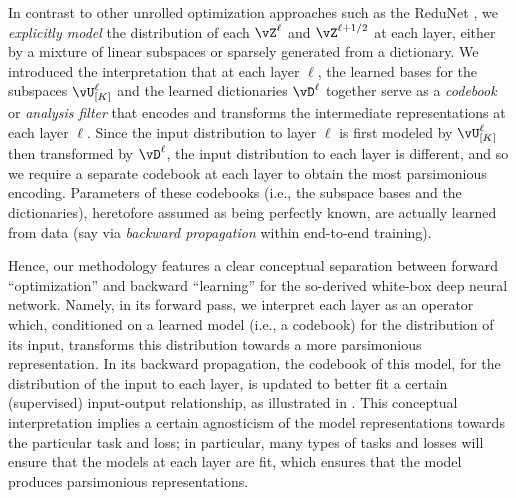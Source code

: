 \documentclass[../../book-main.tex]{subfiles}
\begin{document}
\begin{remark}\label{sub:forward_backward}
    In contrast to other unrolled optimization approaches such as the
    ReduNet \cite{chan2021redunet}, we \textit{explicitly model} the
    distribution of each $\vZ^\ell$ and $\vZ^{\ell + 1/2}$ at each
    layer, either by a mixture of linear subspaces or sparsely
    generated from a dictionary. We introduced the interpretation
    that at each layer \(\ell\), the learned bases for the subspaces
    \(\vU_{[K]}^{\ell}\) and the learned dictionaries \(\vD^{\ell}\)
    together serve as a \textit{codebook} or \textit{analysis filter}
    that encodes and transforms the intermediate representations at
    each layer \(\ell\). Since the input distribution to layer
    \(\ell\) is first modeled by \(\vU_{[K]}^{\ell}\) then
    transformed by \(\vD^{\ell}\), the input distribution to each
    layer is different, and so we require a separate codebook at each
    layer to obtain the most parsimonious encoding. Parameters of
    these codebooks (i.e., the subspace bases and the dictionaries),
    heretofore assumed as being perfectly known, are actually learned
    from data (say via \textit{backward propagation} within
    end-to-end training).

    Hence, our methodology features a clear conceptual separation
    between forward ``optimization'' and backward ``learning'' for
    the so-derived white-box deep neural network. Namely, in its
    forward pass, we interpret each layer as an operator which,
    conditioned on a learned model (i.e., a codebook) for the
    distribution of its input, transforms this distribution towards a
    more parsimonious representation. In its backward propagation,
    the codebook of this model, for the distribution of the input to
    each layer, is updated to better fit a certain (supervised)
    input-output relationship, as illustrated in
    . This conceptual interpretation
    implies a certain agnosticism of the model representations
    towards the particular task and loss; in particular, many types
    of tasks and losses will ensure that the models at each layer are
    fit, which ensures that the model produces parsimonious representations.
\end{remark}
\end{document}
